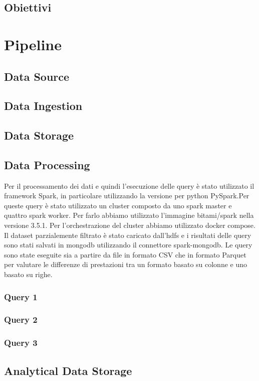 \documentclass[conference]{IEEEtran}
\begin{document}
\subsection{Obiettivi}
\section{Pipeline}
\subsection{Data Source}
\subsection{Data Ingestion}
\subsection{Data Storage}
\subsection{Data Processing}
Per il processamento dei dati e quindi l'esecuzione delle query è stato utilizzato il framework Spark, in particolare utilizzando la versione per python PySpark.Per queste query è stato utilizzato un cluster composto da uno spark master e quattro spark worker. Per farlo abbiamo utilizzato l'immagine bitami/spark nella versione 3.5.1. Per l'orchestrazione del cluster abbiamo utilizzato docker compose.
Il dataset parzialemente filtrato è stato caricato dall'hdfs e i risultati delle query sono stati salvati in mongodb utilizzando il connettore spark-mongodb.
Le query sono state eseguite sia a partire da file in formato CSV che in formato Parquet per valutare le differenze di prestazioni tra un formato basato su colonne e uno basato su righe.
\subsubsection{Query 1}
\subsubsection{Query 2}
\subsubsection{Query 3}
\subsection{Analytical Data Storage}
\end{document}
